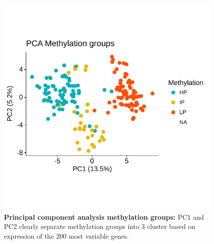 \FloatBarrier

\begin{figure}
	\centering
	\includegraphics[width=0.75\columnwidth]{./Figures/pca_Meth_top150.pdf}
	\caption{\textbf{Principal component analysis methylation groups:} PC1 and PC2 clearly separate methylation groups into 3 cluster based on expression of the 200 most variable genes.}
	\label{fig:pca_Meth_top150}
\end{figure}


